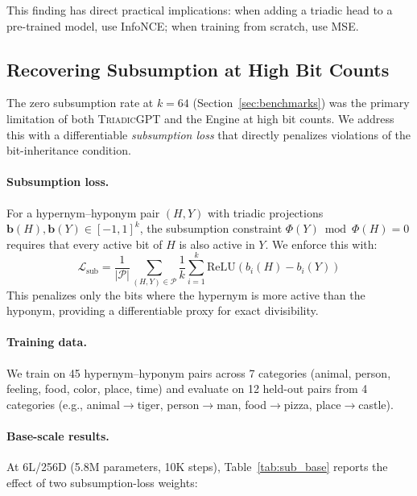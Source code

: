 \documentclass[11pt,a4paper]{article}
\newcommand{\microgpt}{\textsc{TriadicGPT}}
\newcommand{\loss}[1]{\mathcal{L}_{\text{#1}}}
\begin{document}
This finding has direct practical implications: when adding a triadic head to a pre-trained model, use InfoNCE; when training from scratch, use MSE.


\subsection{Recovering Subsumption at High Bit Counts}
\label{sec:subsumption}

The zero subsumption rate at $k=64$ (Section~\ref{sec:benchmarks}) was the primary limitation of both \microgpt{} and the Engine at high bit counts. We address this with a differentiable \emph{subsumption loss} that directly penalizes violations of the bit-inheritance condition.

\paragraph{Subsumption loss.} For a hypernym--hyponym pair $(H, Y)$ with triadic projections $\mathbf{b}(H), \mathbf{b}(Y) \in [-1,1]^k$, the subsumption constraint $\Phi(Y) \bmod \Phi(H) = 0$ requires that every active bit of $H$ is also active in $Y$. We enforce this with:
\begin{equation}
    \loss{sub} = \frac{1}{|\mathcal{P}|} \sum_{(H,Y) \in \mathcal{P}} \frac{1}{k} \sum_{i=1}^{k} \text{ReLU}\!\left(b_i(H) - b_i(Y)\right)
    \label{eq:sub_loss}
\end{equation}
This penalizes only the bits where the hypernym is more active than the hyponym, providing a differentiable proxy for exact divisibility.

\paragraph{Training data.} We train on 45 hypernym--hyponym pairs across 7 categories (animal, person, feeling, food, color, place, time) and evaluate on 12 held-out pairs from 4 categories (e.g., animal$\rightarrow$tiger, person$\rightarrow$man, food$\rightarrow$pizza, place$\rightarrow$castle).

\paragraph{Base-scale results.} At 6L/256D (5.8M parameters, 10K steps), Table~\ref{tab:sub_base} reports the effect of two subsumption-loss weights:
\end{document}
